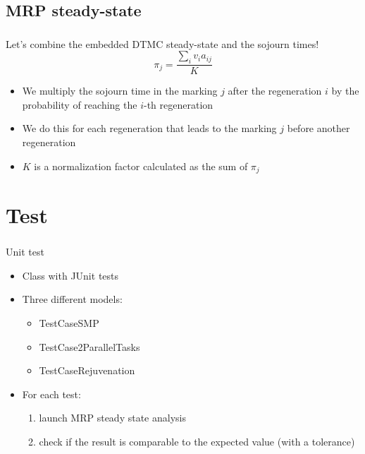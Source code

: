 \subsection{\acf{MRP} steady-state}
\begin{frame}
  \frametitle{\insertsubsection}
  Let's combine the embedded \acs{DTMC} steady-state and the sojourn
  times!
  \pause
  \begin{equation*}
    \pi_j = \frac{\sum_i v_i a_{ij}}{K}
  \end{equation*}
  \pause
  \begin{itemize}
  \item We multiply the sojourn time in the marking $j$ after the
    regeneration $i$ by the probability of reaching the $i$-th regeneration
    \pause
  \item We do this for each regeneration that leads to the marking $j$
    before another regeneration
    \pause
  \item $K$ is a normalization factor calculated as the sum of $\pi_j$
  \end{itemize}
\end{frame}
\section{Test}
\begin{frame}
  \frametitle{\insertsection}
  \begin{block}{Unit test}
    \begin{itemize}
    \item Class  with \alert{JUnit} tests
      \pause
    \item Three different models:
      \pause
      \begin{itemize}
      \item TestCaseSMP
        \pause
      \item TestCase2ParallelTasks
        \pause
      \item TestCaseRejuvenation
        \pause
      \end{itemize}
    \item For each test:
      \pause
      \begin{enumerate}
      \item launch \acs{MRP} steady state \alert{analysis}
        \pause
      \item check if the result is comparable to the \alert{expected}
        value \pause (with a tolerance)
      \end{enumerate}
    \end{itemize}
  \end{block}
\end{frame}

